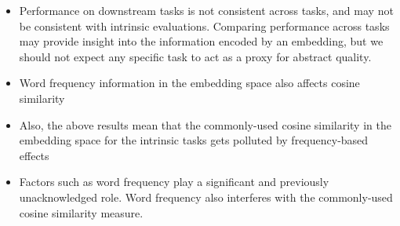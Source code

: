 \documentclass[10pt,a4paper]{article}
\begin{document}
\begin{itemize}
\item{Performance on downstream tasks is not consistent across tasks, and may not be consistent with intrinsic evaluations. Comparing performance across tasks may provide insight into the information encoded by an embedding, but we should not expect any specific task to act as a proxy for abstract quality.}
\item{Word frequency information in the embedding space also affects cosine similarity}
\item{ Also, the above results mean that the commonly-used cosine similarity in the embedding space for the intrinsic tasks gets polluted by frequency-based effects}
\item{Factors such as word frequency
play a significant and previously unacknowledged role. Word frequency also interferes with the commonly-used cosine similarity measure.}
\end{itemize}


\end{document}
